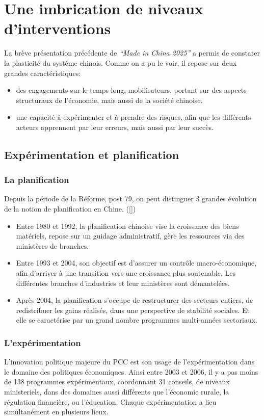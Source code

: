 \documentclass[a4paper]{article}
\begin{document}
\section{Une imbrication de niveaux d’interventions}
\label{sec:org0a2f1cf}
La brève présentation précédente de \emph{“Made in China 2025”} a permis de constater
la plasticité du système chinois. Comme on a pu le voir, il repose sur deux
grandes caractéristiques:
\begin{itemize}
\item des engagements sur le temps long, mobilisateurs, portant sur des aspects
structuraux de l’économie, mais aussi de la société chinoise.
\item une capacité à expérimenter et à prendre des risques, afin que les différents
acteurs apprennent par leur erreurs, mais aussi par leur succès.
\end{itemize}
\subsection{Expérimentation et planification}
\label{sec:org4828e82}
\subsubsection{La planification}
\label{sec:org7c0e0d7}
Depuis la période de la Réforme, post 79, on peut distinguer 3 grandes évolution
de la notion de planification en Chine. ([\cite{heilmann18_red}])
\begin{itemize}
\item Entre 1980 et 1992, la planification chinoise vise la croissance des biens
matériels, repose sur un guidage administratif, gère les ressources via des
ministères de branches.
\item Entre 1993 et 2004, son objectif est d’assurer un contrôle macro-économique,
afin d’arriver à une transition vers une croissance plus soutenable. Les
différentes branches d’industries et leur ministères sont démantelées.
\item Après 2004, la planification s’occupe de restructurer des secteurs entiers, de
redistribuer les gains réalisés, dans une perspective de stabilité sociales.
Et elle se caractérise par un grand nombre programmes multi-années sectoriaux.
\end{itemize}
\subsubsection{L’expérimentation}
\label{sec:orgcd915f5}
L’innovation politique majeure du PCC est son usage de l’expérimentation dans le
domaine des politiques économiques. Ainsi entre 2003 et 2006, il y a pas moins
de 138 programmes expérimentaux, coordonnant 31 conseils, de niveaux
ministeriels, dans des domaines aussi différents que l’économie rurale, la
régulation financière, ou l’éducation. Chaque expérimentation a lieu
simultanément en plusieurs lieux.\\
\end{document}
